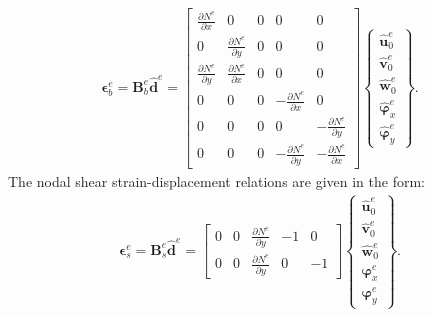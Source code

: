\documentclass[sensors,article,submit,moreauthors,pdftex]{Definitions/mdpi}
\begin{document}
\begin{eqnarray}
\boldsymbol{\epsilon}_b^e =
\textbf{B}_b^e\widehat{\textbf{d}}^e = 
\left [
\begin{array}{ccccc}
\frac{\partial N^e}{\partial x} & 0 & 0 & 0 & 0\\
0 & \frac{\partial N^e}{\partial y} & 0 & 0 & 0\\
\frac{\partial N^e}{\partial y} & \frac{\partial N^e}{\partial x} & 0 & 0 & 0\\
0 & 0 & 0 & -\frac{\partial N^e}{\partial x} & 0\\
0 & 0 & 0 & 0 & -\frac{\partial N^e}{\partial y}\\
0 & 0 & 0 & -\frac{\partial N^e}{\partial y} & -\frac{\partial N^e}{\partial x}
\end{array} \right]
\left \{ \begin{array}{c}
\widehat{\textbf{u}}_0^e \\
\widehat{\textbf{v}}_0^e \\
\widehat{\textbf{w}}_0^e \\
\widehat{\boldsymbol{\varphi}}_x^e \\
\widehat{\boldsymbol{\varphi}}_y^e
\end{array} \right\}.
\end{eqnarray}
The nodal shear strain-displacement relations are given in the form:
\begin{eqnarray}
\boldsymbol{\epsilon}_s^e =
\textbf{B}_s^e\widehat{\textbf{d}}^e = 
\left [
\begin{array}{ccccc}
0 & 0 & \frac{\partial N^e}{\partial y} & -1 & 0\\
0 & 0 & \frac{\partial N^e}{\partial y} & 0 & -1
\end{array} \right]
\left \{ \begin{array}{c}
\widehat{\textbf{u}}_0^e \\
\widehat{\textbf{v}}_0^e \\
\widehat{\textbf{w}}_0^e \\
\boldsymbol{\varphi}_x^e \\
\boldsymbol{\varphi}_y^e
\end{array} \right\}.
\end{eqnarray}
\end{document}
